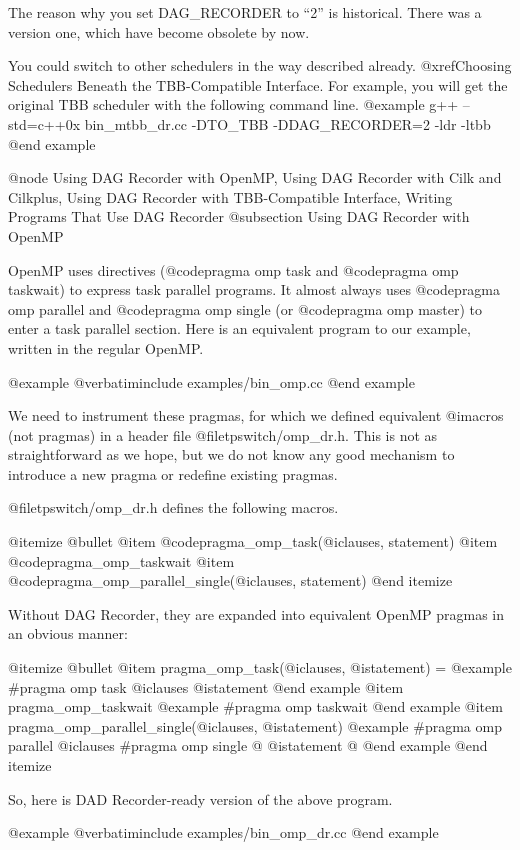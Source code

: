 The reason why you set DAG_RECORDER to ``2'' is historical.  There was a version one, which have become obsolete by now.

You could switch to other schedulers in the way described already. @xref{Choosing Schedulers Beneath the TBB-Compatible Interface}.  For example, you will get the original TBB scheduler with the following command line.
@example
g++ --std=c++0x bin_mtbb_dr.cc -DTO_TBB -DDAG_RECORDER=2 -ldr -ltbb 
@end example

@node Using DAG Recorder with OpenMP, Using DAG Recorder with Cilk and Cilkplus, Using DAG Recorder with TBB-Compatible Interface, Writing Programs That Use DAG Recorder
@subsection Using DAG Recorder with OpenMP

OpenMP uses directives (@code{pragma omp task} and @code{pragma omp
taskwait}) to express task parallel programs.  It almost always uses
@code{pragma omp parallel} and @code{pragma omp single} (or @code{pragma
omp master}) to enter a task parallel section.  Here is an equivalent
program to our example, written in the regular OpenMP.

@example
@verbatiminclude examples/bin_omp.cc
@end example

We need to instrument these pragmas, for which we defined equivalent
@i{macros} (not pragmas) in a header file @file{tpswitch/omp_dr.h}.
This is not as straightforward as we hope, but we do not know any good
mechanism to introduce a new pragma or redefine existing pragmas.

@file{tpswitch/omp_dr.h} defines the following macros.

@itemize @bullet
@item @code{pragma_omp_task(@i{clauses, statement})}
@item @code{pragma_omp_taskwait}
@item @code{pragma_omp_parallel_single(@i{clauses, statement})}
@end itemize

Without DAG Recorder, they are expanded into equivalent OpenMP pragmas
in an obvious manner:

@itemize @bullet
@item pragma_omp_task(@i{clauses}, @i{statement}) =
@example
#pragma omp task @i{clauses}
  @i{statement}
@end example
@item pragma_omp_taskwait 
@example
#pragma omp taskwait
@end example
@item pragma_omp_parallel_single(@i{clauses}, @i{statement})
@example
#pragma omp parallel @i{clauses}
#pragma omp single
@{
  @i{statement}
@}
@end example
@end itemize

So, here is DAD Recorder-ready version of the above program.

@example
@verbatiminclude examples/bin_omp_dr.cc
@end example

